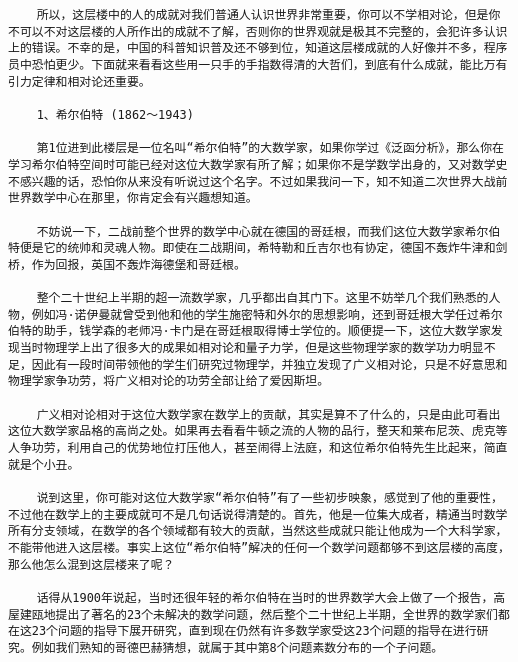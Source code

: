 \begin{verbatim}
    所以，这层楼中的人的成就对我们普通人认识世界非常重要，你可以不学相对论，但是你不可以不对这层楼的人所作出的成就不了解，否则你的世界观就是极其不完整的，会犯许多认识上的错误。不幸的是，中国的科普知识普及还不够到位，知道这层楼成就的人好像并不多，程序员中恐怕更少。下面就来看看这些用一只手的手指数得清的大哲们，到底有什么成就，能比万有引力定律和相对论还重要。

    1、希尔伯特 (1862～1943)

    第1位进到此楼层是一位名叫“希尔伯特”的大数学家，如果你学过《泛函分析》，那么你在学习希尔伯特空间时可能已经对这位大数学家有所了解；如果你不是学数学出身的，又对数学史不感兴趣的话，恐怕你从来没有听说过这个名字。不过如果我问一下，知不知道二次世界大战前世界数学中心在那里，你肯定会有兴趣想知道。

    不妨说一下，二战前整个世界的数学中心就在德国的哥廷根，而我们这位大数学家希尔伯特便是它的统帅和灵魂人物。即使在二战期间，希特勒和丘吉尔也有协定，德国不轰炸牛津和剑桥，作为回报，英国不轰炸海德堡和哥廷根。

    整个二十世纪上半期的超一流数学家，几乎都出自其门下。这里不妨举几个我们熟悉的人物，例如冯·诺伊曼就曾受到他和他的学生施密特和外尔的思想影响，还到哥廷根大学任过希尔伯特的助手，钱学森的老师冯·卡门是在哥廷根取得博士学位的。顺便提一下，这位大数学家发现当时物理学上出了很多大的成果如相对论和量子力学，但是这些物理学家的数学功力明显不足，因此有一段时间带领他的学生们研究过物理学，并独立发现了广义相对论，只是不好意思和物理学家争功劳，将广义相对论的功劳全部让给了爱因斯坦。

    广义相对论相对于这位大数学家在数学上的贡献，其实是算不了什么的，只是由此可看出这位大数学家品格的高尚之处。如果再去看看牛顿之流的人物的品行，整天和莱布尼茨、虎克等人争功劳，利用自己的优势地位打压他人，甚至闹得上法庭，和这位希尔伯特先生比起来，简直就是个小丑。

    说到这里，你可能对这位大数学家“希尔伯特”有了一些初步映象，感觉到了他的重要性，不过他在数学上的主要成就可不是几句话说得清楚的。首先，他是一位集大成者，精通当时数学所有分支领域，在数学的各个领域都有较大的贡献，当然这些成就只能让他成为一个大科学家，不能带他进入这层楼。事实上这位“希尔伯特”解决的任何一个数学问题都够不到这层楼的高度，那么他怎么混到这层楼来了呢？

    话得从1900年说起，当时还很年轻的希尔伯特在当时的世界数学大会上做了一个报告，高屋建瓯地提出了著名的23个未解决的数学问题，然后整个二十世纪上半期，全世界的数学家们都在这23个问题的指导下展开研究，直到现在仍然有许多数学家受这23个问题的指导在进行研究。例如我们熟知的哥德巴赫猜想，就属于其中第8个问题素数分布的一个子问题。


\end{verbatim}
